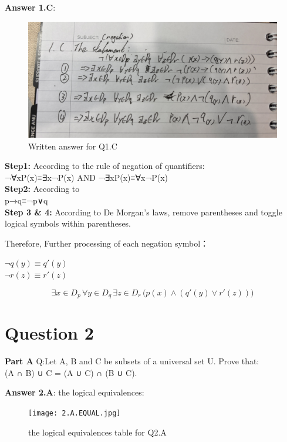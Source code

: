 \documentclass{article}
\begin{document}
		\newpage
		\noindent
		\textbf{Answer 1.C}:
		\begin{figure}[H]
			\centering
			\includegraphics[width=0.75\linewidth]{1.C.jpg}
			\caption{Written answer for Q1.C}
		\end{figure}
		
		\noindent
		\textbf{Step1:} According to the rule of negation of quantifiers: \\
			¬∀xP(x)≡∃x¬P(x) AND ¬∃xP(x)≡∀x¬P(x)\\
		\textbf{Step2:} According to \\
			p→q≡¬p∨q\\
		\textbf{Step 3 \& 4:} According to De Morgan's laws, remove parentheses and toggle logical symbols within parentheses.\par
		
		Therefore, 
		Further processing of each negation symbol：\\
		\begin{center}
		$¬q(y)≡q′(y)$\\
		$¬r(z)≡r′(z)$\\
		\end{center}
		\[
		\exists x \in D_p \, \forall y \in D_q \, \exists z \in D_r \, \big(p(x) \land (q'(y) \lor r'(z))\big)
		\]
		\newpage
		
	\section{Question 2}
	\textbf{Part A}
		\noindent	
		Q:Let A, B and C be subsets of a universal set U. Prove that:\\
			(A ∩ B) ∪ C = (A ∪ C) ∩ (B ∪ C).
			
		\par
		\noindent
		\textbf{Answer 2.A}: the logical equivalences:
		
		\begin{figure}[H]
			\centering
			\texttt{[image: 2.A.EQUAL.jpg]}
			\caption{the logical equivalences table for Q2.A}
		\end{figure}
		\par
		
\end{document}
